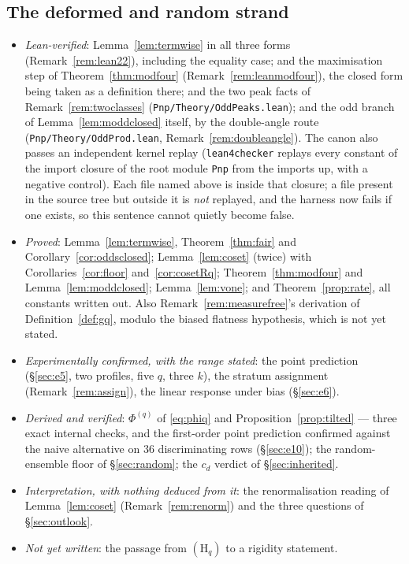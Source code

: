 \documentclass[11pt,a4paper]{article}
\theoremstyle{plain}
\theoremstyle{definition}
\theoremstyle{remark}
\begin{document}
\subsection{The deformed and random strand}\label{sec:scope4}
\begin{itemize}
\item \emph{Lean-verified}: Lemma~\ref{lem:termwise} in all three forms
      (Remark~\ref{rem:lean22}), including the equality case; and the maximisation step of
      Theorem~\ref{thm:modfour} (Remark~\ref{rem:leanmodfour}), the closed form being taken
      as a definition there; and the two peak facts of Remark~\ref{rem:twoclasses}
      (\texttt{Pnp/Theory/OddPeaks.lean}); and the odd branch of Lemma~\ref{lem:moddclosed}
      itself, by the double-angle route (\texttt{Pnp/Theory/OddProd.lean},
      Remark~\ref{rem:doubleangle}). The canon also passes an independent kernel replay
      (\texttt{lean4checker} replays every constant of the import closure of the root module
      \texttt{Pnp} from the imports up, with a negative control). Each file named above is
      inside that closure; a file present in the source tree but outside it is \emph{not}
      replayed, and the harness now fails if one exists, so this sentence cannot quietly
      become false.
\item \emph{Proved}: Lemma~\ref{lem:termwise}, Theorem~\ref{thm:fair} and
      Corollary~\ref{cor:oddsclosed}; Lemma~\ref{lem:coset} (twice) with
      Corollaries~\ref{cor:floor} and~\ref{cor:cosetRq}; Theorem~\ref{thm:modfour} and
      Lemma~\ref{lem:moddclosed}; Lemma~\ref{lem:vone}; and Theorem~\ref{prop:rate}, all
      constants written out. Also Remark~\ref{rem:measurefree}'s derivation of
      Definition~\ref{def:gq}, modulo the biased flatness hypothesis, which is not yet stated.
\item \emph{Experimentally confirmed, with the range stated}: the point prediction
      (\S\ref{sec:e5}, two profiles, five $q$, three $k$), the stratum assignment
      (Remark~\ref{rem:assign}), the linear response under bias (\S\ref{sec:e6}).
\item \emph{Derived and verified}: $\Phi^{(q)}$ of \eqref{eq:phiq} and
      Proposition~\ref{prop:tilted} --- three exact internal checks, and the first-order
      point prediction confirmed against the naive alternative on $36$ discriminating rows
      (\S\ref{sec:e10}); the random-ensemble floor of \S\ref{sec:random}; the $c_d$
      verdict of \S\ref{sec:inherited}.
\item \emph{Interpretation, with nothing deduced from it}: the renormalisation reading of
      Lemma~\ref{lem:coset} (Remark~\ref{rem:renorm}) and the three questions of
      \S\ref{sec:outlook}.
\item \emph{Not yet written}: the passage from $(\mathrm{H}_q)$ to a rigidity statement.
\end{itemize}
\end{document}
